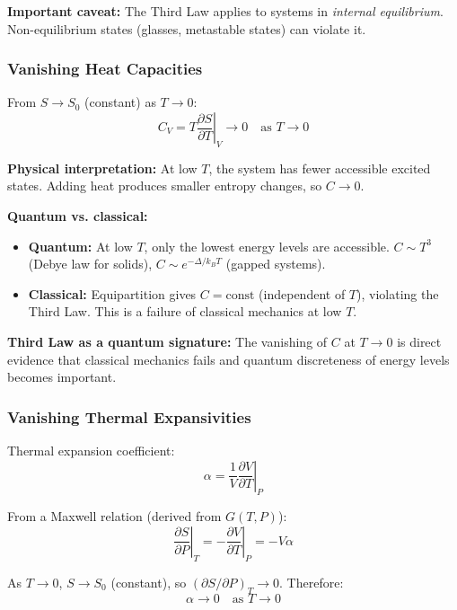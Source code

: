 \documentclass[9pt,twocoloumn]{article}
\begin{document}
\textbf{Important caveat:} The Third Law applies to systems in \emph{internal equilibrium}. Non-equilibrium states (glasses, metastable states) can violate it.

\subsubsection{Vanishing Heat Capacities}

From $S \to S_0$ (constant) as $T \to 0$:
\begin{equation}
C_V = T \left. \frac{\partial S}{\partial T} \right|_V \to 0 \quad \text{as } T \to 0
\end{equation}

\textbf{Physical interpretation:} At low $T$, the system has fewer accessible excited states. Adding heat produces smaller entropy changes, so $C \to 0$.

\textbf{Quantum vs. classical:}
\begin{itemize}
    \item \textbf{Quantum:} At low $T$, only the lowest energy levels are accessible. $C \sim T^3$ (Debye law for solids), $C \sim e^{-\Delta/k_B T}$ (gapped systems).
    \item \textbf{Classical:} Equipartition gives $C = \text{const}$ (independent of $T$), violating the Third Law. This is a failure of classical mechanics at low $T$.
\end{itemize}

\textbf{Third Law as a quantum signature:} The vanishing of $C$ at $T \to 0$ is direct evidence that classical mechanics fails and quantum discreteness of energy levels becomes important.

\subsubsection{Vanishing Thermal Expansivities}

Thermal expansion coefficient:
\begin{equation}
\alpha = \frac{1}{V} \left. \frac{\partial V}{\partial T} \right|_P
\end{equation}

From a Maxwell relation (derived from $G(T, P)$):
\begin{equation}
\left. \frac{\partial S}{\partial P} \right|_T = -\left. \frac{\partial V}{\partial T} \right|_P = -V \alpha
\end{equation}

As $T \to 0$, $S \to S_0$ (constant), so $(\partial S/\partial P)_T \to 0$. Therefore:
\begin{equation}
\boxed{\alpha \to 0 \quad \text{as } T \to 0}
\end{equation}
\end{document}
